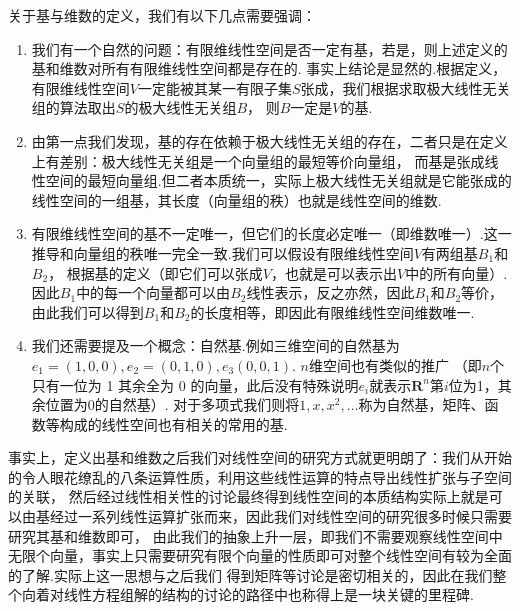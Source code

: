 关于基与维数的定义，我们有以下几点需要强调：
\begin{enumerate}
    \item 我们有一个自然的问题：有限维线性空间是否一定有基，若是，则上述定义的基和维数对所有有限维线性空间都是存在的.
    事实上结论是显然的.根据定义，有限维线性空间$V$一定能被其某一有限子集$S$张成，我们根据求取极大线性无关组的算法取出$S$的极大线性无关组$B$，
    则$B$一定是$V$的基.

    \item 由第一点我们发现，基的存在依赖于极大线性无关组的存在，二者只是在定义上有差别：极大线性无关组是一个向量组的最短等价向量组，
    而基是张成线性空间的最短向量组.但二者本质统一，实际上极大线性无关组就是它能张成的线性空间的一组基，其长度（向量组的秩）也就是线性空间的维数.

    \item 有限维线性空间的基不一定唯一，但它们的长度必定唯一（即维数唯一）.这一推导和向量组的秩唯一完全一致.我们可以假设有限维线性空间$V$有两组基$B_1$和$B_2$，
    根据基的定义（即它们可以张成$V$，也就是可以表示出$V$中的所有向量）.因此$B_1$中的每一个向量都可以由$B_2$线性表示，反之亦然，因此$B_1$和$B_2$等价，
    由此我们可以得到$B_1$和$B_2$的长度相等，即因此有限维线性空间维数唯一.
    
    \item 我们还需要提及一个概念：自然基.例如三维空间的自然基为$e_1=(1,0,0),e_2=(0,1,0),e_3(0,0,1)$. $n$维空间也有类似的推广
    （即$n$个只有一位为 1 其余全为 0 的向量，此后没有特殊说明$e_i$就表示$\mathbf{R}^n$第$i$位为1，其余位置为0的自然基）.
    对于多项式我们则将$1,x,x^2,\ldots$称为自然基，矩阵、函数等构成的线性空间也有相关的常用的基.
\end{enumerate}

事实上，定义出基和维数之后我们对线性空间的研究方式就更明朗了：我们从开始的令人眼花缭乱的八条运算性质，利用这些线性运算的特点导出线性扩张与子空间的关联，
然后经过线性相关性的讨论最终得到线性空间的本质结构实际上就是可以由基经过一系列线性运算扩张而来，因此我们对线性空间的研究很多时候只需要研究其基和维数即可，
由此我们的抽象上升一层，即我们不需要观察线性空间中无限个向量，事实上只需要研究有限个向量的性质即可对整个线性空间有较为全面的了解.实际上这一思想与之后我们
得到矩阵等讨论是密切相关的，因此在我们整个向着对线性方程组解的结构的讨论的路径中也称得上是一块关键的里程碑.

